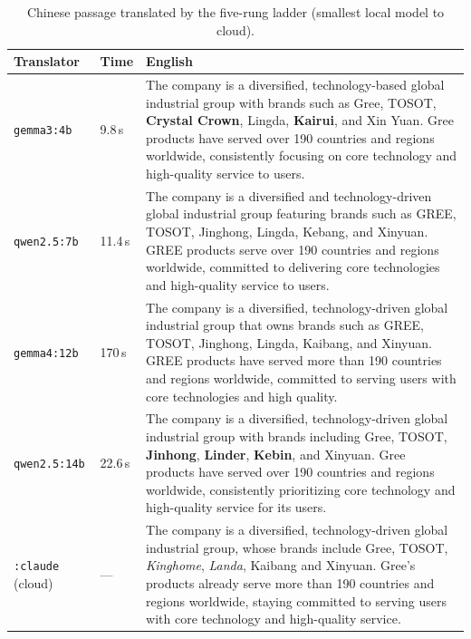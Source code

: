 \documentclass[11pt,a4paper]{report}
\begin{document}
\begin{table}[h]
\small
\caption{Chinese passage translated by the five-rung ladder (smallest local model to cloud).}
\label{tab:ladder-china}
\begin{tabular}{@{}l l p{}@{}}
\toprule
\textbf{Translator} & \textbf{Time} & \textbf{English} \\
\midrule
\texttt{gemma3:4b} & 9.8\,s & The company is a diversified, technology-based global industrial group with brands such as Gree, TOSOT, \textbf{Crystal Crown}, Lingda, \textbf{Kairui}, and Xin Yuan. Gree products have served over 190 countries and regions worldwide, consistently focusing on core technology and high-quality service to users. \\
\addlinespace
\texttt{qwen2.5:7b} & 11.4\,s & The company is a diversified and technology-driven global industrial group featuring brands such as GREE, TOSOT, Jinghong, Lingda, Kebang, and Xinyuan. GREE products serve over 190 countries and regions worldwide, committed to delivering core technologies and high-quality service to users. \\
\addlinespace
\texttt{gemma4:12b} & 170\,s & The company is a diversified, technology-driven global industrial group that owns brands such as GREE, TOSOT, Jinghong, Lingda, Kaibang, and Xinyuan. GREE products have served more than 190 countries and regions worldwide, committed to serving users with core technologies and high quality. \\
\addlinespace
\texttt{qwen2.5:14b} & 22.6\,s & The company is a diversified, technology-driven global industrial group with brands including Gree, TOSOT, \textbf{Jinhong}, \textbf{Linder}, \textbf{Kebin}, and Xinyuan. Gree products have served over 190 countries and regions worldwide, consistently prioritizing core technology and high-quality service for its users. \\
\addlinespace
\texttt{:claude} (cloud) & --- & The company is a diversified, technology-driven global industrial group, whose brands include Gree, TOSOT, \emph{Kinghome}, \emph{Landa}, Kaibang and Xinyuan. Gree's products already serve more than 190 countries and regions worldwide, staying committed to serving users with core technology and high-quality service. \\
\bottomrule
\end{tabular}
\end{table}
\end{document}

